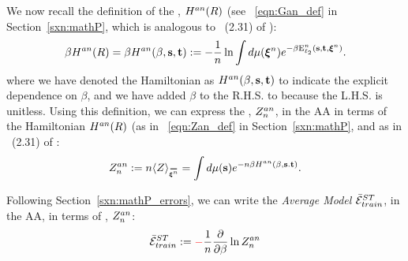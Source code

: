 We now recall the definition of the \AnnealedHamiltonian, $H^{an}(R)$ (see \EQN~\ref{eqn:Gan_def} in Section~\ref{sxn:mathP}, which is analogous to \EQN~(2.31) of \cite{SST92}):
\begin{align}
\label{eqn:Gan0}
\beta H^{an}(R) = \beta H^{an}(\beta,{\mathbf{s}},{\mathbf{t}}):=-\frac{1}{n}\ln \int d\mu(\boldsymbol{\xi}^{n})e^{-\beta\mathbf{\mathrm{E}}^{n}_{\ell_2}({\mathbf{s}},{\mathbf{t}}, \boldsymbol{\xi}^{n})}  .
\end{align}
where we have denoted the Hamiltonian as $H^{an}(\beta,{\mathbf{s}},{\mathbf{t}})$ to indicate the explicit dependence on $\beta$,
and we have added $\beta$ to the R.H.S. to because the L.H.S. is unitless.
%
Using this definition, we can express the \Annealed \PartitionFunction, $Z^{an}_{n}$, in the AA in terms of the \Annealed Hamiltonian $H^{an}(R)$
(as in \EQN~\ref{eqn:Zan_def} in Section~\ref{sxn:mathP}, and as in \EQN~(2.31) of \cite{SST92}:
\begin{align}
 \label{eqn:Zan}
Z^{an}_{\ND}:=\ND\langle Z\rangle_{\AVGNDXI}=\int d\mu(\SVEC)e^{-\ND\beta\HAN(\beta,\SVEC.\TVEC)}  .
\end{align}

Following Section~\ref{sxn:mathP_errors}, we can write the \emph{Average Model \TrainingError} $\bar{\mathcal{E}}^{ST}_{train}$, in the AA,
in terms of \Annealed \PartitionFunction, $Z^{an}_{n}$:
\begin{align}
 \label{eqn:AVGSTTE_AA}
\bar{\mathcal{E}}^{ST}_{train}:= {\color{red}\sf{-}}\frac{1}{n}\dfrac{\partial }{\partial \beta} \ln Z^{an}_{n}
\end{align}


